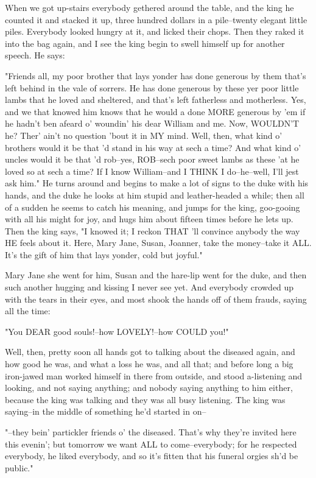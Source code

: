 When we got up-stairs everybody gethered around the table, and the king
he counted it and stacked it up, three hundred dollars in a pile--twenty
elegant little piles.  Everybody looked hungry at it, and licked their
chops.  Then they raked it into the bag again, and I see the king begin
to swell himself up for another speech.  He says:

"Friends all, my poor brother that lays yonder has done generous by them
that's left behind in the vale of sorrers.  He has done generous by these
yer poor little lambs that he loved and sheltered, and that's left
fatherless and motherless.  Yes, and we that knowed him knows that he
would a done MORE generous by 'em if he hadn't ben afeard o' woundin' his
dear William and me.  Now, WOULDN'T he?  Ther' ain't no question 'bout it
in MY mind.  Well, then, what kind o' brothers would it be that 'd stand
in his way at sech a time?  And what kind o' uncles would it be that 'd
rob--yes, ROB--sech poor sweet lambs as these 'at he loved so at sech a
time?  If I know William--and I THINK I do--he--well, I'll jest ask him."
He turns around and begins to make a lot of signs to the duke with his
hands, and the duke he looks at him stupid and leather-headed a while;
then all of a sudden he seems to catch his meaning, and jumps for the
king, goo-gooing with all his might for joy, and hugs him about fifteen
times before he lets up.  Then the king says, "I knowed it; I reckon THAT
'll convince anybody the way HE feels about it.  Here, Mary Jane, Susan,
Joanner, take the money--take it ALL.  It's the gift of him that lays
yonder, cold but joyful."

Mary Jane she went for him, Susan and the hare-lip went for the duke, and
then such another hugging and kissing I never see yet.  And everybody
crowded up with the tears in their eyes, and most shook the hands off of
them frauds, saying all the time:

"You DEAR good souls!--how LOVELY!--how COULD you!"

Well, then, pretty soon all hands got to talking about the diseased
again, and how good he was, and what a loss he was, and all that; and
before long a big iron-jawed man worked himself in there from outside,
and stood a-listening and looking, and not saying anything; and nobody
saying anything to him either, because the king was talking and they was
all busy listening.  The king was saying--in the middle of something he'd
started in on--

"--they bein' partickler friends o' the diseased.  That's why they're
invited here this evenin'; but tomorrow we want ALL to come--everybody;
for he respected everybody, he liked everybody, and so it's fitten that
his funeral orgies sh'd be public."

